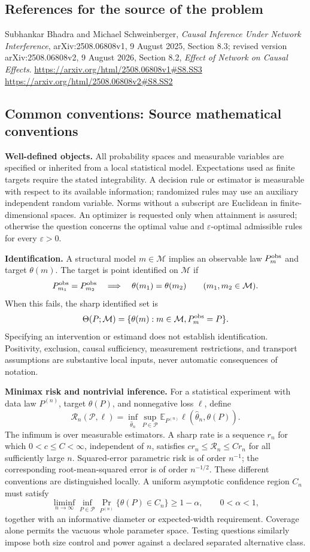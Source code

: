 \documentclass[11pt,a4paper]{article}
\newcommand{\E}{\mathbb E}
\begin{document}
\subsection*{References for the source of the problem}
Subhankar Bhadra and Michael Schweinberger, \emph{Causal Inference Under Network Interference}, arXiv:2508.06808v1, 9 August 2025, Section 8.3; revised version arXiv:2508.06808v2, 9 August 2026, Section 8.2, \emph{Effect of Network on Causal Effects}.
\url{https://arxiv.org/html/2508.06808v1#S8.SS3}
\url{https://arxiv.org/html/2508.06808v2#S8.SS2}

\subsection*{Common conventions: Source mathematical conventions}

\textbf{Well-defined objects.}
All probability spaces and measurable variables are specified or inherited
from a local statistical model. Expectations used as finite targets require
the stated integrability. A decision rule or estimator is measurable with
respect to its available information; randomized rules may use an auxiliary
independent random variable. Norms without a subscript are Euclidean in
finite-dimensional spaces. An optimizer is requested only when attainment
is assured; otherwise the question concerns the optimal value and
$\varepsilon$-optimal admissible rules for every $\varepsilon>0$.

\textbf{Identification.}
A structural model $m\in\mathcal M$ implies an observable law
$P_m^{\rm obs}$ and target $\theta(m)$. The target is point identified on
$\mathcal M$ if
\[
 P_{m_1}^{\rm obs}=P_{m_2}^{\rm obs}
 \quad\Longrightarrow\quad\theta(m_1)=\theta(m_2)
 \qquad(m_1,m_2\in\mathcal M).
\]
When this fails, the sharp identified set is
\[
 \Theta(P;\mathcal M)=\{\theta(m):m\in\mathcal M,
                                  P_m^{\rm obs}=P\}.
\]
Specifying an intervention or estimand does not establish identification.
Positivity, exclusion, causal sufficiency, measurement restrictions, and
transport assumptions are substantive local inputs, never automatic
consequences of notation.

\textbf{Minimax risk and nontrivial inference.}
For a statistical experiment with data law $P^{(n)}$, target $\theta(P)$,
and nonnegative loss $\ell$, define
\[
 \mathcal R_n(\mathcal P,\ell)
   =\inf_{\widehat\theta_n}\sup_{P\in\mathcal P}
      \E_{P^{(n)}}\ell(\widehat\theta_n,\theta(P)).
\]
The infimum is over measurable estimators. A sharp rate is a sequence
$r_n$ for which $0<c\leq C<\infty$, independent of $n$, satisfies
$c r_n\leq\mathcal R_n\leq C r_n$ for all sufficiently large $n$.
Squared-error parametric risk is of order $n^{-1}$; the corresponding
root-mean-squared error is of order $n^{-1/2}$. These different conventions
are distinguished locally. A uniform asymptotic confidence region $C_n$
must satisfy
\[
 \liminf_{n\to\infty}\inf_{P\in\mathcal P}
     \Pr_{P^{(n)}}\{\theta(P)\in C_n\}\geq 1-\alpha,
 \qquad 0<\alpha<1,
\]
together with an informative diameter or expected-width requirement.
Coverage alone permits the vacuous whole parameter space. Testing questions
similarly impose both size control and power against a declared separated
alternative class.
\end{document}
